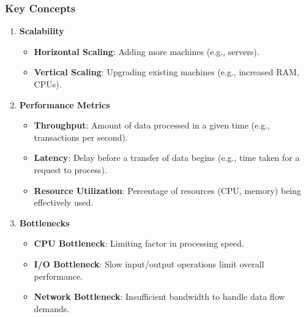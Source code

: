 \documentclass[aspectratio=169]{beamer}
\begin{document}
\begin{frame}[fragile]
    \frametitle{Key Concepts}
    \begin{enumerate}
        \item \textbf{Scalability}
        \begin{itemize}
            \item \textbf{Horizontal Scaling}: Adding more machines (e.g., servers).
            \item \textbf{Vertical Scaling}: Upgrading existing machines (e.g., increased RAM, CPUs).
        \end{itemize}

        \item \textbf{Performance Metrics}
        \begin{itemize}
            \item \textbf{Throughput}: Amount of data processed in a given time (e.g., transactions per second).
            \item \textbf{Latency}: Delay before a transfer of data begins (e.g., time taken for a request to process).
            \item \textbf{Resource Utilization}: Percentage of resources (CPU, memory) being effectively used.
        \end{itemize}

        \item \textbf{Bottlenecks}
        \begin{itemize}
            \item \textbf{CPU Bottleneck}: Limiting factor in processing speed.
            \item \textbf{I/O Bottleneck}: Slow input/output operations limit overall performance.
            \item \textbf{Network Bottleneck}: Insufficient bandwidth to handle data flow demands.
        \end{itemize}
    \end{enumerate}
\end{frame}
\end{document}
